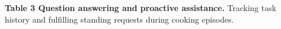 \documentclass[10pt]{article}
\begin{document}
\newcommand{\ivgnotes}{}
\renewcommand{\ivgnote}[1]{\gdef\ivgnotes{#1}}

\par\vspace{6pt}
{\fontsize{8.8}{10.3}\selectfont\textsf{\textbf{Table 3 Question answering and proactive assistance.}} Tracking task history and fulfilling standing requests during cooking episodes. \ivgnotes\par}
\end{document}
